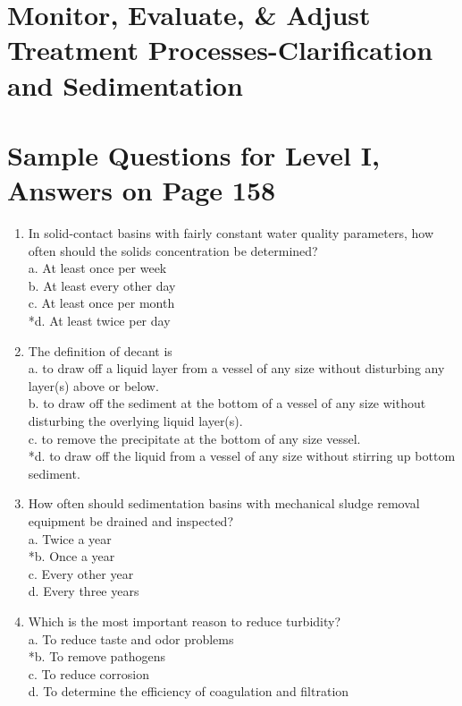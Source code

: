 \section{Monitor, Evaluate, \& Adjust Treatment Processes-Clarification and Sedimentation}
\section{Sample Questions for Level I, Answers on Page 158}
\begin{enumerate}[label=TI\arabic*]

  \item In solid-contact basins with fairly constant water quality parameters, how often should the solids concentration be determined?\\
a. At least once per week\\
b. At least every other day\\
c. At least once per month\\
*d. At least twice per day\\
  \item The definition of decant is\\
a. to draw off a liquid layer from a vessel of any size without disturbing any layer(s) above or below.\\
b. to draw off the sediment at the bottom of a vessel of any size without disturbing the overlying liquid layer(s).\\
c. to remove the precipitate at the bottom of any size vessel.\\
*d. to draw off the liquid from a vessel of any size without stirring up bottom sediment.\\
  \item How often should sedimentation basins with mechanical sludge removal equipment be drained and inspected?\\
a. Twice a year\\
*b. Once a year\\
c. Every other year\\
d. Every three years\\
  \item Which is the most important reason to reduce turbidity?\\
a. To reduce taste and odor problems\\
*b. To remove pathogens\\
c. To reduce corrosion\\
d. To determine the efficiency of coagulation and filtration\\
\end{enumerate}
